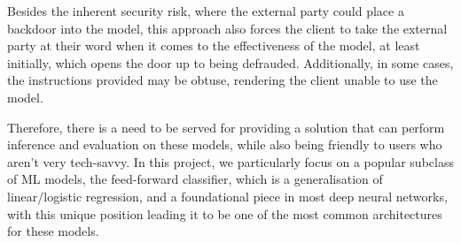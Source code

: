 \documentclass[12pt, titlepage]{article}
\begin{document}
Besides the inherent security risk, where the external party could place a backdoor into the model, this approach also forces the client to take the external party at their word when it comes to the effectiveness of the model, at least initially, which opens the door up to being defrauded. Additionally, in some cases, the instructions provided may be obtuse, rendering the client unable to use the model.\bigskip

Therefore, there is a need to be served for providing a solution that can perform inference and evaluation on these models, while also being friendly to users who aren't very tech-savvy. In this project, we particularly focus on a popular subclass of ML models, the feed-forward classifier, which is a generalisation of linear/logistic regression, and a foundational piece in most deep neural networks, with this unique position leading it to be one of the most common architectures for these models.
\end{document}
